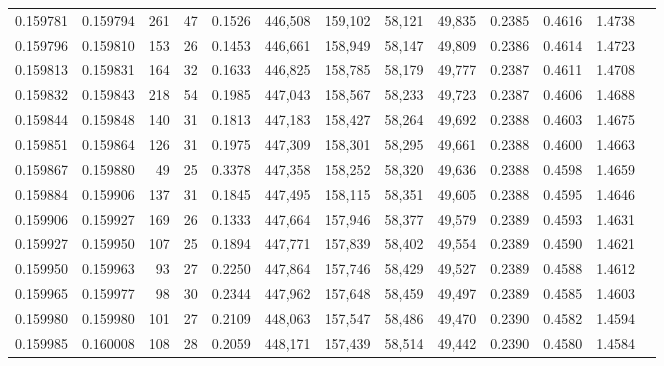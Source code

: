 \begin{tabular}{rrrrrrrrrrrrr}
0.159781 & 0.159794 &   261 &  47 &                                     0.1526 & 446,508 & 159,102 &  58,121 &  49,835 & 0.2385 & 0.4616 & 1.4738 \\
0.159796 & 0.159810 &   153 &  26 &                                     0.1453 & 446,661 & 158,949 &  58,147 &  49,809 & 0.2386 & 0.4614 & 1.4723 \\
0.159813 & 0.159831 &   164 &  32 &                                     0.1633 & 446,825 & 158,785 &  58,179 &  49,777 & 0.2387 & 0.4611 & 1.4708 \\
0.159832 & 0.159843 &   218 &  54 &                                     0.1985 & 447,043 & 158,567 &  58,233 &  49,723 & 0.2387 & 0.4606 & 1.4688 \\
0.159844 & 0.159848 &   140 &  31 &                                     0.1813 & 447,183 & 158,427 &  58,264 &  49,692 & 0.2388 & 0.4603 & 1.4675 \\
0.159851 & 0.159864 &   126 &  31 &                                     0.1975 & 447,309 & 158,301 &  58,295 &  49,661 & 0.2388 & 0.4600 & 1.4663 \\
0.159867 & 0.159880 &    49 &  25 &                                     0.3378 & 447,358 & 158,252 &  58,320 &  49,636 & 0.2388 & 0.4598 & 1.4659 \\
0.159884 & 0.159906 &   137 &  31 &                                     0.1845 & 447,495 & 158,115 &  58,351 &  49,605 & 0.2388 & 0.4595 & 1.4646 \\
0.159906 & 0.159927 &   169 &  26 &                                     0.1333 & 447,664 & 157,946 &  58,377 &  49,579 & 0.2389 & 0.4593 & 1.4631 \\
0.159927 & 0.159950 &   107 &  25 &                                     0.1894 & 447,771 & 157,839 &  58,402 &  49,554 & 0.2389 & 0.4590 & 1.4621 \\
0.159950 & 0.159963 &    93 &  27 &                                     0.2250 & 447,864 & 157,746 &  58,429 &  49,527 & 0.2389 & 0.4588 & 1.4612 \\
0.159965 & 0.159977 &    98 &  30 &                                     0.2344 & 447,962 & 157,648 &  58,459 &  49,497 & 0.2389 & 0.4585 & 1.4603 \\
0.159980 & 0.159980 &   101 &  27 &                                     0.2109 & 448,063 & 157,547 &  58,486 &  49,470 & 0.2390 & 0.4582 & 1.4594 \\
0.159985 & 0.160008 &   108 &  28 &                                     0.2059 & 448,171 & 157,439 &  58,514 &  49,442 & 0.2390 & 0.4580 & 1.4584 \\

\end{tabular}
